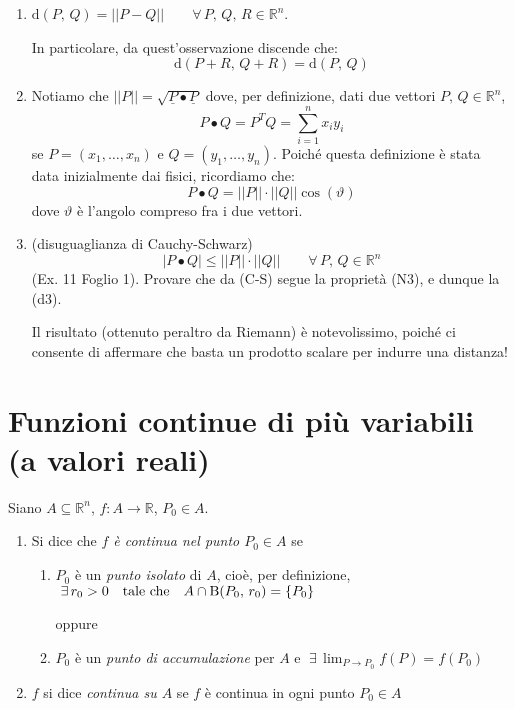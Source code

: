\begin{obs}
\mbox{}
\begin{enumerate}[labelindent=\parindent,leftmargin=*,label=\textnormal{(\roman*)},start=1]
\item $\mathrm{d}(P,\, Q) = ||P-Q|| \qquad \forall \, P,\, Q,\, R \in \mathbb{R}^n$.

In particolare, da quest'osservazione discende che:
$$\mathrm{d}(P+R,\, Q+R) = \mathrm{d}(P,\, Q)$$

\item Notiamo che $||P|| = \sqrt{\underline{P} \bullet \underline{P}}$ dove, per definizione, dati due vettori $P,\, Q \in \mathbb{R}^n$,
$$P \bullet Q = P^TQ = \sum_{i=1}^{n} x_iy_i$$
se $P=(x_1,\ldots,x_n)$ e $Q=(y_1,\ldots,y_n)$. Poiché questa definizione è stata data inizialmente dai fisici, ricordiamo che:
$$P \bullet Q = ||P||\cdot||Q||\cos(\vartheta)$$
dove $\vartheta$ è l'angolo compreso fra i due vettori.

\item (disuguaglianza di Cauchy-Schwarz)
$$|P \bullet Q| \leq ||P||\cdot||Q|| \qquad \forall \, P,\, Q \in \mathbb{R}^n$$
(Ex. 11 Foglio 1). Provare che da (C-S) segue la proprietà (N3), e dunque la (d3).

Il risultato (ottenuto peraltro da Riemann) è notevolissimo, poiché ci consente di affermare che basta un prodotto scalare per indurre una distanza!
\end{enumerate}
\end{obs}



\section{Funzioni continue di più variabili (a valori reali)}
\begin{definition}
Siano $A \subseteq \mathbb{R}^n$, $f:A \longrightarrow \mathbb{R}$, $P_0 \in A$.
\begin{enumerate}[labelindent=\parindent,leftmargin=*,label=\textnormal{(\roman*)},start=1]
\item Si dice che \emph{$f$ è continua nel punto $P_0 \in A$} se
	\begin{enumerate}[labelindent=\parindent,leftmargin=*,label=\textnormal{(\arabic*)},start=1]
	\item $P_0$ è un \emph{punto isolato} di $A$, cioè, per definizione, $\; \exists \, r_0>0 \quad \text{tale che} \quad \break A \cap \mathrm{B}(P_0,\, r_0) = \lbrace P_0 \rbrace$
	
	\begin{center}oppure\end{center}
	
	\item $P_0$ è un \emph{punto di accumulazione} per $A$ e $\; \displaystyle \exists \, \lim_{P \rightarrow P_0} f(P) = f(P_0)$
	\end{enumerate}

\item $f$ si dice \emph{continua su $A$} se $f$ è continua in ogni punto $P_0 \in A$
\end{enumerate}
\end{definition}

